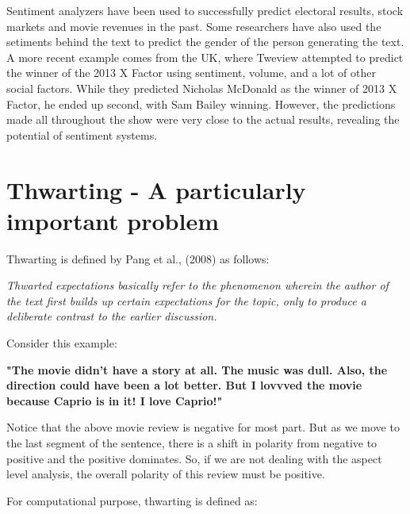 \vspace{8mm}

Sentiment analyzers have been used to successfully predict electoral results, stock markets and movie revenues in the past. Some researchers have also used the setiments behind
the text to predict the gender of the person generating the text. A more recent example comes from the UK, 
where Tweview attempted to predict the winner of the 2013 X Factor using sentiment, volume, and a lot of other social factors.
While they predicted Nicholas McDonald as the winner of 2013 X Factor, he ended up second, with Sam Bailey winning. 
However, the predictions made all throughout the show were very close to the actual results, revealing the potential of sentiment systems.
\cite{url:1}

\section{Thwarting - A particularly important problem}

Thwarting is defined by Pang et al., (2008) as follows:

\vspace{8mm}

\textit{Thwarted expectations basically refer to the
phenomenon wherein the author of the text first
builds up certain expectations for the topic, only
to produce a deliberate contrast to the earlier
discussion.}

\vspace{8mm}

Consider this example:

\vspace{8mm}

\textbf{"The movie didn't have a story at all. The music was dull. Also, the direction could have been a lot better. But I lovvved the movie because Caprio is in it! I love Caprio!"}

\vspace{8mm}

Notice that the above movie review is negative for most part. But as we move to the last segment of the sentence, there is a shift in polarity from negative to positive
and the positive dominates. So, if we are not dealing with the aspect level analysis, the overall polarity of this review must be positive.

\vspace{8mm}

For computational purpose, thwarting is defined as:

